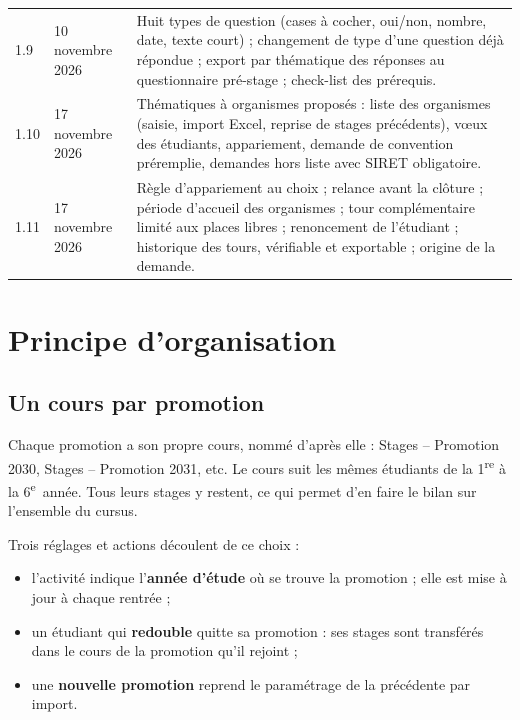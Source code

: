 \documentclass[11pt,a4paper]{article}
\begin{document}
\begin{center}
\begin{tabularx}{\linewidth}{@{}l l X@{}}
1.9 & 10 novembre 2026 & Huit types de question (cases à cocher, oui/non, nombre, date, texte court) ; changement de type d'une question déjà répondue ; export par thématique des réponses au questionnaire pré-stage ; check-list des prérequis. \\
1.10 & 17 novembre 2026 & Thématiques à organismes proposés : liste des organismes (saisie, import Excel, reprise de stages précédents), vœux des étudiants, appariement, demande de convention préremplie, demandes hors liste avec SIRET obligatoire. \\
1.11 & 17 novembre 2026 & Règle d'appariement au choix ; relance avant la clôture ; période d'accueil des organismes ; tour complémentaire limité aux places libres ; renoncement de l'étudiant ; historique des tours, vérifiable et exportable ; origine de la demande. \\
\bottomrule
\end{tabularx}
\end{center}

\newpage

\section{Principe d'organisation}

\subsection{Un cours par promotion}

Chaque promotion a son propre cours, nommé d'après elle :
\og Stages -- Promotion 2030\fg{}, \og Stages -- Promotion 2031\fg{}, etc.
Le cours suit les mêmes étudiants de la 1\textsuperscript{re} à la
6\textsuperscript{e}~année. Tous leurs stages y restent, ce qui permet d'en
faire le bilan sur l'ensemble du cursus.

Trois réglages et actions découlent de ce choix :
\begin{itemize}
  \item l'activité indique l'\textbf{année d'étude} où se trouve la promotion ;
        elle est mise à jour à chaque rentrée ;
  \item un étudiant qui \textbf{redouble} quitte sa promotion : ses stages sont
        transférés dans le cours de la promotion qu'il rejoint ;
  \item une \textbf{nouvelle promotion} reprend le paramétrage de la précédente
        par import.
\end{itemize}
\end{document}

